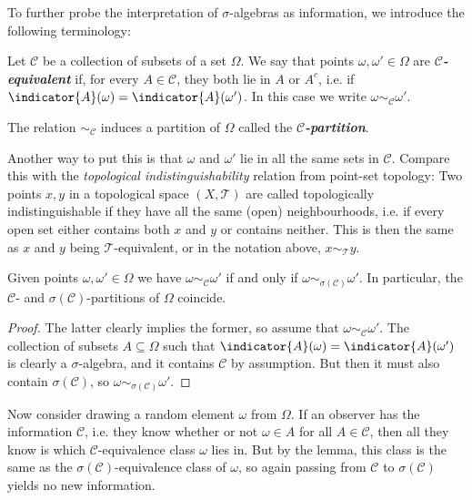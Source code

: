 \documentclass[article, a4paper, 11pt, oneside]{memoir}
\numberwithin{equation}{chapter}
\newcommand{\calT}{\mathcal{T}}
\newcommand{\calC}{\mathcal{C}}
\newcommand{\keyword}[1]{{\itshape\bfseries #1}}
\begin{document}
To further probe the interpretation of $\sigma$-algebras as information, we introduce the following terminology:

\begin{definition}
    Let $\calC$ be a collection of subsets of a set $\Omega$. We say that points $\omega, \omega' \in \Omega$ are \keyword{$\calC$-equivalent} if, for every $A \in \calC$, they both lie in $A$ or $A^c$, i.e. if $\indicator{A}(\omega) = \indicator{A}(\omega')$. In this case we write $\omega \sim_\calC \omega'$.

    The relation $\sim_\calC$ induces a partition of $\Omega$ called the \keyword{$\calC$-partition}.
\end{definition}
%
Another way to put this is that $\omega$ and $\omega'$ lie in all the same sets in $\calC$. Compare this with the \emph{topological indistinguishability} relation from point-set topology: Two points $x,y$ in a topological space $(X,\calT)$ are called topologically indistinguishable if they have all the same (open) neighbourhoods, i.e. if every open set either contains both $x$ and $y$ or contains neither. This is then the same as $x$ and $y$ being $\calT$-equivalent, or in the notation above, $x \sim_\calT y$.

\begin{lemma}
    Given points $\omega, \omega' \in \Omega$ we have $\omega \sim_\calC \omega'$ if and only if $\omega \sim_{\sigma(\calC)} \omega'$. In particular, the $\calC$- and $\sigma(\calC)$-partitions of $\Omega$ coincide.
\end{lemma}

\begin{proof}
    The latter clearly implies the former, so assume that $\omega \sim_\calC \omega'$. The collection of subsets $A \subseteq \Omega$ such that $\indicator{A}(\omega) = \indicator{A}(\omega')$ is clearly a $\sigma$-algebra, and it contains $\calC$ by assumption. But then it must also contain $\sigma(\calC)$, so $\omega \sim_{\sigma(\calC)} \omega'$.
\end{proof}
%
Now consider drawing a random element $\omega$ from $\Omega$. If an observer has the information $\calC$, i.e. they know whether or not $\omega \in A$ for all $A \in \calC$, then all they know is which $\calC$-equivalence class $\omega$ lies in. But by the lemma, this class is the same as the $\sigma(\calC)$-equivalence class of $\omega$, so again passing from $\calC$ to $\sigma(\calC)$ yields no new information.

\end{document}

